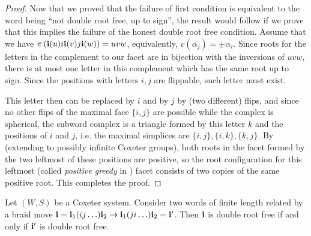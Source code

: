 \begin{proof}
Now that we proved that the failure of  first condition is equivalent to the word being ``not double root free, up to sign'', the result would follow if we prove that this implies the failure of the honest double root free condition.
 Assume that we have $\pi\left(\mathbf{i}(u) i \mathbf{i}(v) j \mathbf{i}(w)\right) = uvw$, equivalently,  $v(\alpha_j) = \pm \alpha_i$. Since roots for the letters in the complement to our facet are in bijection with the inversions of $uvw$, 
 there is at most one letter in this complement which has the same root up to sign. Since the positions with letters $i, j$ are flippable, such letter must exist.  

This letter then can be replaced by $i$ and by $j$ by (two different) flips, and since no other flips of the maximal face $\{i, j\}$ are possible while the complex is spherical, the subword complex is a triangle formed by this letter $k$ and the positions of 
$i$ and $j$, i.e. the maximal simplices are $\{i, j\}, \{i, k\}, \{k, j\}$. 
By \cite[Lemma 2.6]{BergeronCeballos} (extending \cite[Lemmas 3.3 and 3.6]{cls} to possibly infinite Coxeter groups),
both roots in the facet formed by the two leftmost of these positions are positive, so the root configuration for  this leftmost (called \emph{positive greedy} in \cite{PilaudStump-EL}) facet 
consists of two copies of the same positive root. This completes the proof.
\end{proof}

\begin{corollary} 
\label{cor:drf_braid_invariant}
Let $(W, S)$ be a Coxeter system. Consider two words
of finite length related by a braid move $\mathbf{i} = \mathbf{i}_1 (ij \ldots) \mathbf{i}_2 \to \mathbf{i}_1 (j i \ldots) \mathbf{i}_2 = \mathbf{i}'$. Then $\mathbf{i}$ is double root free if and only if $\mathbf{i}'$ is double root free.
\end{corollary}